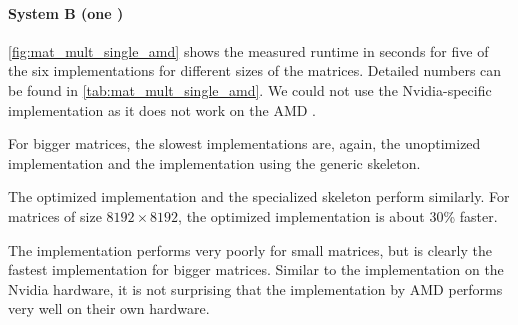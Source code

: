 \paragraph{System B (one \GPU)}
\autoref{fig:mat_mult_single_amd} shows the measured runtime in seconds for five of the six implementations for different sizes of the matrices.
Detailed numbers can be found in \autoref{tab:mat_mult_single_amd}.
We could not use the Nvidia-specific \CUBLAS implementation as it does not work on the AMD \GPU.

For bigger matrices, the slowest implementations are, again, the unoptimized \OpenCL implementation and the implementation using the generic \allpairs skeleton.

The optimized \OpenCL implementation and the specialized \allpairs skeleton perform similarly.
For matrices of size $8192\times 8192$, the optimized \OpenCL implementation is about 30\% faster.

The \clBLAS implementation performs very poorly for small matrices, but is clearly the fastest implementation for bigger matrices.
Similar to the \CUBLAS implementation on the Nvidia hardware, it is not surprising that the implementation by AMD performs very well on their own hardware.


